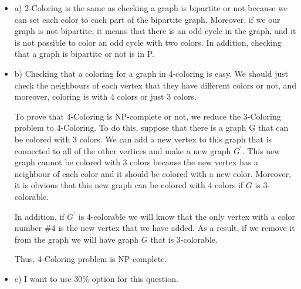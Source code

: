 \documentclass[12pt]{article}
\newenvironment{solution}[2][Solution]{\begin{trivlist}
\item[\hskip \labelsep {\bfseries #1}]}{\end{trivlist}}
\begin{document}
\begin{solution}{}
\begin{itemize}
\item a) 2-Coloring is the same as checking a graph is bipartite or not because we can set 
each color to each part of the bipartite graph. Moreover, if we our graph is not bipartite,
it means that there is an odd cycle in the graph, and it is not possible to color an odd cycle
with two colors. In addition, checking that a graph is bipartite or not is in P.

\item b) Checking that a coloring for a graph in 4-coloring is easy. We should just check
the neighbours of each vertex that they have different colors or not, and moreover, coloring 
is with 4 colors or just 3 colors.

To prove that 4-Coloring is NP-complete or not, we reduce the 3-Coloring problem to 4-Coloring.
To do this, suppose that there is a graph G that can be colored with 3 colors. We can add a
new vertex to this graph that is connected to all of the other vertices and make a new graph
$G^\prime$. This new graph cannot be colored with 3 colors because the new vertex has a neighbour
of each color and it should be colored with a new color. Moreover, it is obvious that this new
graph can be colored with 4 colors if $G$ is 3-colorable.

In addition, if $G^\prime$ is 4-colorable we will know that the only vertex with a color number 
$\# 4$ is the new vertex that we have added. As a result, if we remove it from the graph we will 
have graph $G$ that is 3-colorable.

Thus, 4-Coloring problem is NP-complete.

\item c) I want to use 30\% option for this question.
\end{itemize}
\end{solution}

\pagebreak
\end{document}
